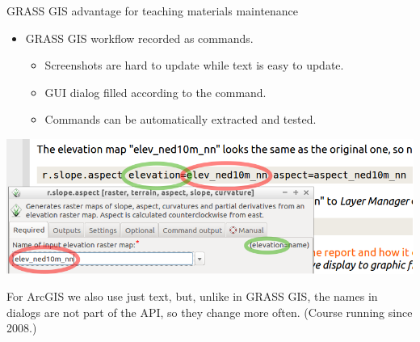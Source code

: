 \documentclass[xcolor={dvipsnames,usenames},beamer]{beamer}
\begin{document}
\begin{frame}{GRASS GIS advantage for teaching materials maintenance}

\begin{itemize}
 \item GRASS GIS workflow recorded as commands.
 \begin{itemize}
 \item Screenshots are hard to update while text is easy to update.
 \item GUI dialog filled according to the command.
 \item Commands can be automatically extracted and tested.
 \end{itemize}
\end{itemize}

\begin{center}
\colorbox{gray!20}{
\includegraphics[height=0.5\textheight]{./images/edu/grass_cmd_gui}
}
\end{center}



\scriptsize
For ArcGIS we also use just text, but, unlike in GRASS GIS,
the names in dialogs are not part of the API, so they change more often.
{\tiny(Course running since 2008.)}

\end{frame}
\end{document}
